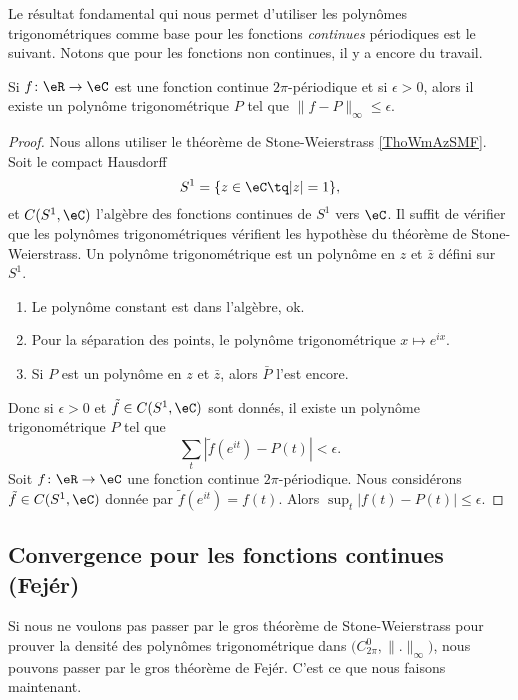 Le résultat fondamental qui nous permet d'utiliser les polynômes trigonométriques comme base pour les fonctions \emph{continues} périodiques est le suivant. Notons que pour les fonctions non continues, il y a encore du travail.
\begin{lemma}   \label{LemXGYaRlC}
    Si \( f\colon \eR\to \eC\) est une fonction continue \( 2\pi\)-périodique et si \( \epsilon>0\), alors il existe un polynôme trigonométrique \( P\) tel que \( \| f-P \|_{\infty}\leq \epsilon\).
\end{lemma}

\begin{proof}
    Nous allons utiliser le théorème de Stone-Weierstrass \ref{ThoWmAzSMF}. Soit le compact Hausdorff
    \begin{equation}
        S^1=\{ z\in \eC\tq | z |=1 \},
    \end{equation}
    et \( C(S^1,\eC)\) l'algèbre des fonctions continues de \( S^1\) vers \( \eC\). Il suffit de vérifier que les polynômes trigonométriques vérifient les hypothèse du théorème de Stone-Weierstrass. Un polynôme trigonométrique est un polynôme en \( z\) et \( \bar z\) défini sur \( S^1\).
    \begin{enumerate}
        \item
            Le polynôme constant est dans l'algèbre, ok.
        \item
            Pour la séparation des points, le polynôme trigonométrique \( x\mapsto  e^{ix}\).
        \item
            Si \( P\) est un polynôme en \( z\) et \( \bar z\), alors \( \bar P\) l'est encore.
    \end{enumerate}
    Donc si \( \epsilon>0\) et \( \tilde f\in C(S^1,\eC)\) sont donnés, il existe un polynôme trigonométrique \( P\) tel que
    \begin{equation}
        \sum_t| \tilde f( e^{it})-P(t) |<\epsilon.
    \end{equation}
    Soit \( f\colon \eR\to \eC\) une fonction continue \( 2\pi\)-périodique. Nous considérons \( \tilde f\in C(S^1,\eC)\) donnée par \( \tilde f( e^{it})=f(t)\). Alors \( \sup_t| f(t)-P(t) |\leq \epsilon\).
\end{proof}

\subsection{Convergence pour les fonctions continues (Fejér)}
Si nous ne voulons pas passer par le gros théorème de Stone-Weierstrass pour prouver la densité des polynômes trigonométrique dans \( \big( C^0_{2\pi},\| . \|_{\infty} \big)\), nous pouvons passer par le gros théorème de Fejér. C'est ce que nous faisons maintenant.

